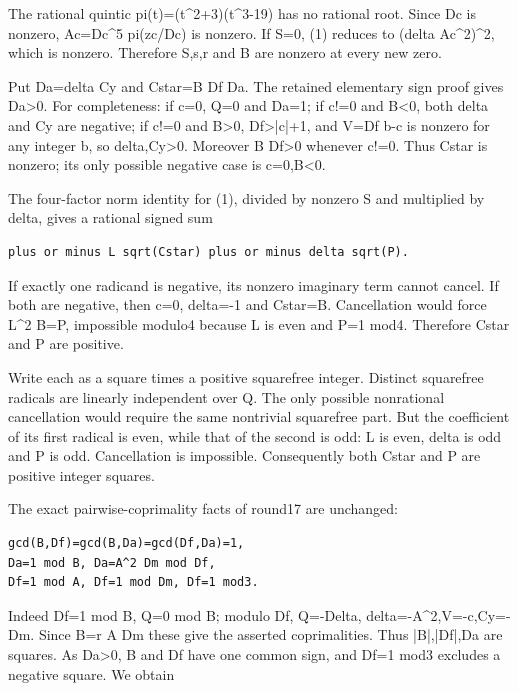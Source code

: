 The rational quintic pi(t)=(t\textasciicircum{}2+3)(t\textasciicircum{}3-19) has no rational root. Since
Dc is nonzero, Ac=Dc\textasciicircum{}5 pi(zc/Dc) is nonzero. If S=0, (1) reduces to
(delta Ac\textasciicircum{}2)\textasciicircum{}2, which is nonzero. Therefore S,s,r and B are nonzero
at every new zero.

Put Da=delta Cy and Cstar=B Df Da. The retained elementary sign proof gives
Da>0. For completeness: if c=0, Q=0 and Da=1; if c!=0 and B<0,
both delta and Cy are negative; if c!=0 and B>0, Df>|c|+1, and
V=Df b-c is nonzero for any integer b, so delta,Cy>0. Moreover B Df>0
whenever c!=0. Thus Cstar is nonzero; its only possible negative case is
c=0,B<0.

The four-factor norm identity for (1), divided by nonzero S and multiplied
by delta, gives a rational signed sum

\begingroup\small
\begin{verbatim}
plus or minus L sqrt(Cstar) plus or minus delta sqrt(P).
\end{verbatim}
\endgroup

If exactly one radicand is negative, its nonzero imaginary term cannot cancel.
If both are negative, then c=0, delta=-1 and Cstar=B. Cancellation would
force L\textasciicircum{}2 B=P, impossible modulo4 because L is even and P=1 mod4.
Therefore Cstar and P are positive.

Write each as a square times a positive squarefree integer. Distinct
squarefree radicals are linearly independent over Q. The only possible
nonrational cancellation would require the same nontrivial squarefree part.
But the coefficient of its first radical is even, while that of the second
is odd: L is even, delta is odd and P is odd. Cancellation is impossible.
Consequently both Cstar and P are positive integer squares.

The exact pairwise-coprimality facts of round17 are unchanged:

\begingroup\small
\begin{verbatim}
gcd(B,Df)=gcd(B,Da)=gcd(Df,Da)=1,
Da=1 mod B, Da=A^2 Dm mod Df,
Df=1 mod A, Df=1 mod Dm, Df=1 mod3.
\end{verbatim}
\endgroup

Indeed Df=1 mod B, Q=0 mod B; modulo Df, Q=-Delta,
delta=-A\textasciicircum{}2,V=-c,Cy=-Dm. Since B=r A Dm these give the asserted
coprimalities. Thus |B|,|Df|,Da are squares. As Da>0, B and Df have
one common sign, and Df=1 mod3 excludes a negative square. We obtain

